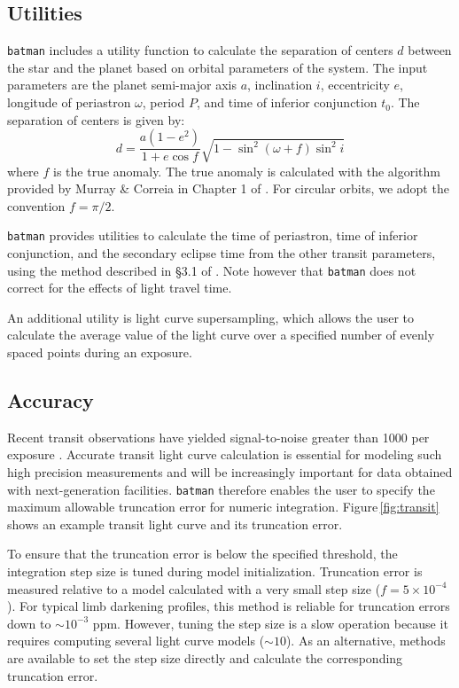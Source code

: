 \documentclass[12pt,preprint]{aastex}
\begin{document}
\subsection{Utilities}
\texttt{batman} includes a utility function to calculate the separation of centers $d$ between the star and the planet based on orbital parameters of the system.  The input parameters are the planet semi-major axis $a$, inclination $i$, eccentricity $e$, longitude of periastron $\omega$, period $P$, and time of inferior conjunction $t_0$.  The separation of centers is given by:
$$
d = \frac{a(1-e^2)}{1+e\cos{f}}\sqrt{1-\sin^2{(\omega+f)}\sin^2{i}}
$$
where $f$ is the true anomaly.  The true anomaly is calculated with the algorithm provided by Murray \& Correia in Chapter 1 of \cite{seager10}. For circular orbits, we adopt the convention $f = \pi/2$.

\texttt{batman} provides utilities to calculate the time of periastron, time of inferior conjunction, and the secondary eclipse time from the other transit parameters, using the method described in \S 3.1 of \cite{eastman13}.  Note however that \texttt{batman} does not correct for the effects of light travel time.

An additional utility is light curve supersampling, which allows the user to calculate the average value of the light curve over a specified number of evenly spaced points during an exposure.

\subsection{Accuracy}
Recent transit observations have yielded signal-to-noise greater than 1000 per exposure \citep[e.g.][]{kreidberg14a, knutson14b}.  Accurate transit light curve calculation is essential for modeling such high precision measurements and will be increasingly important for data obtained with next-generation facilities.  \texttt{batman} therefore enables the user to specify the maximum allowable truncation error for numeric integration.  Figure\,\ref{fig:transit} shows an example transit light curve and its truncation error.

To ensure that the truncation error is below the specified threshold, the integration step size is tuned during model initialization.  Truncation error is measured relative to a model calculated with a very small step size ($f = 5\times10^{-4}$).  For typical limb darkening profiles, this method is reliable for truncation errors down to $\sim 10^{-3}$ ppm. However, tuning the step size is a slow operation because it requires computing several light curve models ($\sim10$). As an alternative, methods are available to set the step size directly and calculate the corresponding truncation error. 
\end{document}
